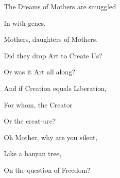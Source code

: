 \documentclass{article}
\begin{document}
\newline

The Dreams of Mothers are smuggled 
\newline

In with genes.
\newline

Mothers, daughters of Mothers.
\newline

Did they drop Art to Create Us?
\newline

Or was it Art all along?
\newline

And if Creation equals Liberation,
\newline

For whom, the Creator 
\newline

Or the creat-ure?
\newline

Oh Mother, why are you silent,
\newline

Like a banyan tree, 
\newline

On the question of Freedom?
\newline
\end{document}
